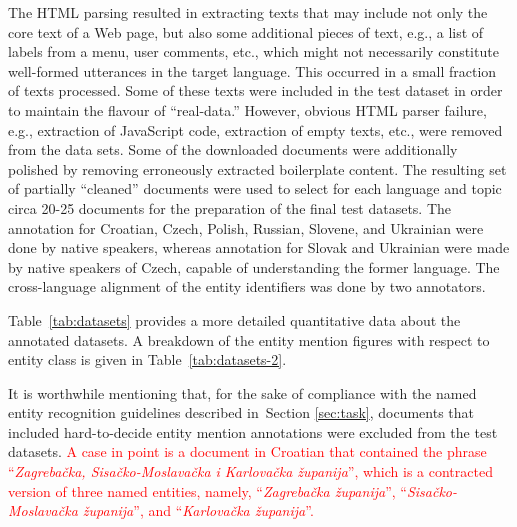 \documentclass[11pt]{article}
\newcommand{\alert}[1]{\textcolor{red}{#1}}
\begin{document}
The HTML parsing resulted in extracting texts that may include not only
the core text of a Web page, but also some additional pieces of text,
e.g., a list of labels from a menu, user comments, etc., which might not
necessarily constitute well-formed utterances in the target language.
This occurred in a small fraction of texts processed.  Some of
these texts were included in the test dataset in order to maintain the
flavour of ``real-data.''  However, obvious HTML parser failure, e.g.,
extraction of JavaScript code, extraction of empty texts, etc., were removed
from the data sets.  Some of the downloaded documents were
additionally polished by removing erroneously extracted boilerplate
content.  The resulting set of partially ``cleaned'' documents were used to
select for each language and topic circa 20-25 documents for the
preparation of the final test datasets. The annotation for Croatian,
Czech, Polish, Russian, Slovene, and Ukrainian were done by native speakers, whereas
annotation for Slovak and Ukrainian were made by native speakers of Czech, capable 
of understanding the former language. The cross-language alignment of the entity identifiers was
done by two annotators. 

Table~\ref{tab:datasets} provides a more detailed quantitative data about the annotated datasets. A breakdown 
of the entity mention figures with respect to entity class is given in Table~\ref{tab:datasets-2}. 

It is worthwhile mentioning that, for the sake of compliance with the named
entity recognition guidelines described in~Section \ref{sec:task}, documents
that included hard-to-decide entity mention annotations were excluded from the
test datasets. \alert{A case in point is a document in Croatian that contained the
	phrase ``\textit{Zagrebačka, Sisačko-Moslavačka i Karlovačka
	županija}'', which is a contracted version of three named entities,
namely, ``\textit{Zagrebačka županija}'', ``\textit{Sisačko-Moslavačka
županija}'', and ``\textit{Karlovačka županija}''.}
\end{document}
